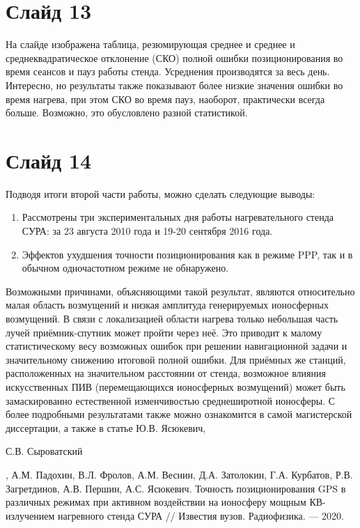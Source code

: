 \documentclass[a4paper,14pt]{extarticle}
\begin{document}
\section*{Слайд 13}
На слайде изображена таблица, резюмирующая среднее и среднее и среднеквадратическое отклонение (СКО) полной ошибки позиционирования во время сеансов и пауз работы стенда.
Усреднения производятся за весь день.
Интересно, но результаты также показывают более низкие значения ошибки во время нагрева, при этом СКО во время пауз, наоборот, практически всегда больше.
Возможно, это обусловлено разной статистикой.

\section*{Слайд 14}
Подводя итоги второй части работы, можно сделать следующие выводы:
\begin{enumerate}[leftmargin=*]
\item Рассмотрены три экспериментальных дня работы нагревательного стенда СУРА: за 23 августа 2010 года и 19-20 сентября 2016 года.
\item Эффектов ухудшения точности позиционирования как в режиме PPP, так и в обычном одночастотном режиме не обнаружено.
\end{enumerate}

Возможными причинами, объясняющими такой результат, являются относительно малая область возмущений и низкая амплитуда генерируемых ионосферных возмущений.
В связи с локализацией области нагрева только небольшая часть лучей приёмник-спутник может пройти через неё.
Это приводит к малому статистическому весу возможных ошибок при решении навигационной задачи и значительному снижению итоговой полной ошибки.
Для приёмных же станций, расположенных на значительном расстоянии от стенда, возможное влияния искусственных ПИВ (перемещающихся ионосферных возмущений) может быть замаскированно естественной изменчивостью среднеширотной ионосферы. 
С более подробными результатами также можно ознакомится в самой магистерской диссертации, а также в статье Ю.В. Ясюкевич, \begin{bf}С.В. Сыроватский\end{bf}, А.М. Падохин, В.Л. Фролов, А.М. Веснин, Д.А. Затолокин, Г.А. Курбатов, Р.В. Загретдинов, А.В. Першин, А.С. Ясюкевич. Точность позиционирования GPS в различных режимах при активном воздействии на ионосферу мощным КВ-излучением нагревного стенда СУРА // Известия вузов. Радиофизика. --- 2020.
\end{document}
